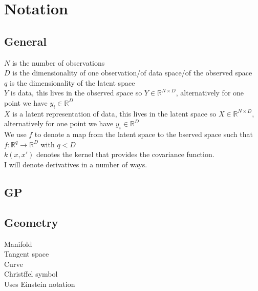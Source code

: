 \chapter*{Notation}
\section*{General}
$N$ is the number of observations \\
$D$ is the dimensionality of one observation/of data space/of the observed space \\
$q$ is the dimensionality of the latent space \\
$Y$ is data, this lives in the observed space so $Y \in \mathbb{R}^{N\times D}$, alternatively for one point we have $y_i \in \mathbb{R}^{D}$ \\
$X$ is a latent representation of data, this lives in the latent space so $X \in \mathbb{R}^{N\times D}$, alternatively for one point we have $y_i \in \mathbb{R}^{D}$ \\
We use $f$ to denote a map from the latent space to the bserved space such that $f: \mathbb{R}^q \to \mathbb{R}^D$ with $q < D$\\
$k(x,x')$ denotes the kernel that provides the covariance function. \\

I will denote derivatives in a number of ways. 



\section*{GP}


\section*{Geometry}
Manifold \\
Tangent space \\
Curve \\
Christffel symbol \\
Uses Einstein notation \\

\cleardoublepage
\fi


\endgroup